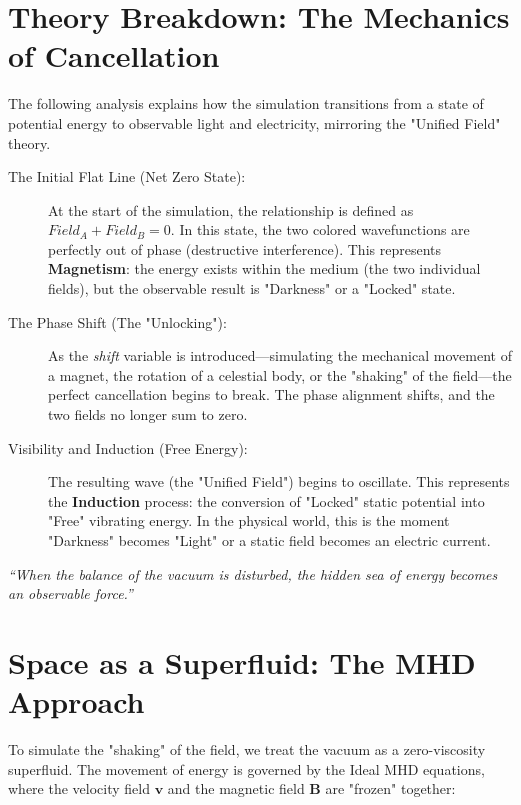 \documentclass[11pt]{article}
\begin{document}
\section*{Theory Breakdown: The Mechanics of Cancellation}

The following analysis explains how the simulation transitions from a state of potential energy to observable light and electricity, mirroring the "Unified Field" theory.

\begin{description}
    \item[The Initial Flat Line (Net Zero State):] 
    At the start of the simulation, the relationship is defined as $Field_{A} + Field_{B} = 0$. In this state, the two colored wavefunctions are perfectly out of phase (destructive interference). This represents \textbf{Magnetism}: the energy exists within the medium (the two individual fields), but the observable result is "Darkness" or a "Locked" state.

    \item[The Phase Shift (The "Unlocking"):] 
    As the \textit{shift} variable is introduced—simulating the mechanical movement of a magnet, the rotation of a celestial body, or the "shaking" of the field—the perfect cancellation begins to break. The phase alignment shifts, and the two fields no longer sum to zero.
    
    \item[Visibility and Induction (Free Energy):] 
    The resulting wave (the "Unified Field") begins to oscillate. This represents the \textbf{Induction} process: the conversion of "Locked" static potential into "Free" vibrating energy. In the physical world, this is the moment "Darkness" becomes "Light" or a static field becomes an electric current.
\end{description}

\begin{center}
    \textit{“When the balance of the vacuum is disturbed, the hidden sea of energy becomes an observable force.”}
\end{center}


\section{Space as a Superfluid: The MHD Approach}
To simulate the "shaking" of the field, we treat the vacuum as a zero-viscosity superfluid. The movement of energy is governed by the Ideal MHD equations, where the velocity field $\mathbf{v}$ and the magnetic field $\mathbf{B}$ are "frozen" together:
\end{document}
